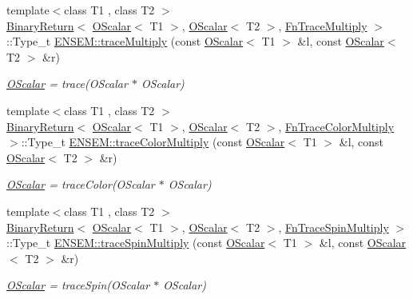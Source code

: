 \begin{DoxyCompactItemize}
{\footnotesize template$<$class T1 , class T2 $>$ }\\\mbox{\hyperlink{structENSEM_1_1BinaryReturn}{Binary\+Return}}$<$ \mbox{\hyperlink{classENSEM_1_1OScalar}{O\+Scalar}}$<$ T1 $>$, \mbox{\hyperlink{classENSEM_1_1OScalar}{O\+Scalar}}$<$ T2 $>$, \mbox{\hyperlink{structENSEM_1_1FnTraceMultiply}{Fn\+Trace\+Multiply}} $>$\+::Type\+\_\+t \mbox{\hyperlink{group__obsscalar_ga5b8fcde5132f05c1632c08d0e22c04a7}{E\+N\+S\+E\+M\+::trace\+Multiply}} (const \mbox{\hyperlink{classENSEM_1_1OScalar}{O\+Scalar}}$<$ T1 $>$ \&l, const \mbox{\hyperlink{classENSEM_1_1OScalar}{O\+Scalar}}$<$ T2 $>$ \&r)
\begin{DoxyCompactList}\small\item\em \mbox{\hyperlink{classENSEM_1_1OScalar}{O\+Scalar}} = trace(\+O\+Scalar $\ast$ O\+Scalar) \end{DoxyCompactList}\item 
{\footnotesize template$<$class T1 , class T2 $>$ }\\\mbox{\hyperlink{structENSEM_1_1BinaryReturn}{Binary\+Return}}$<$ \mbox{\hyperlink{classENSEM_1_1OScalar}{O\+Scalar}}$<$ T1 $>$, \mbox{\hyperlink{classENSEM_1_1OScalar}{O\+Scalar}}$<$ T2 $>$, \mbox{\hyperlink{structENSEM_1_1FnTraceColorMultiply}{Fn\+Trace\+Color\+Multiply}} $>$\+::Type\+\_\+t \mbox{\hyperlink{group__obsscalar_gabe14ff90818892f233905fa6dad8eb49}{E\+N\+S\+E\+M\+::trace\+Color\+Multiply}} (const \mbox{\hyperlink{classENSEM_1_1OScalar}{O\+Scalar}}$<$ T1 $>$ \&l, const \mbox{\hyperlink{classENSEM_1_1OScalar}{O\+Scalar}}$<$ T2 $>$ \&r)
\begin{DoxyCompactList}\small\item\em \mbox{\hyperlink{classENSEM_1_1OScalar}{O\+Scalar}} = trace\+Color(\+O\+Scalar $\ast$ O\+Scalar) \end{DoxyCompactList}\item 
{\footnotesize template$<$class T1 , class T2 $>$ }\\\mbox{\hyperlink{structENSEM_1_1BinaryReturn}{Binary\+Return}}$<$ \mbox{\hyperlink{classENSEM_1_1OScalar}{O\+Scalar}}$<$ T1 $>$, \mbox{\hyperlink{classENSEM_1_1OScalar}{O\+Scalar}}$<$ T2 $>$, \mbox{\hyperlink{structENSEM_1_1FnTraceSpinMultiply}{Fn\+Trace\+Spin\+Multiply}} $>$\+::Type\+\_\+t \mbox{\hyperlink{group__obsscalar_ga4f302dae1d100fdae28fb6e784a8bc3b}{E\+N\+S\+E\+M\+::trace\+Spin\+Multiply}} (const \mbox{\hyperlink{classENSEM_1_1OScalar}{O\+Scalar}}$<$ T1 $>$ \&l, const \mbox{\hyperlink{classENSEM_1_1OScalar}{O\+Scalar}}$<$ T2 $>$ \&r)
\begin{DoxyCompactList}\small\item\em \mbox{\hyperlink{classENSEM_1_1OScalar}{O\+Scalar}} = trace\+Spin(\+O\+Scalar $\ast$ O\+Scalar) \end{DoxyCompactList}\item 

\end{DoxyCompactItemize}
